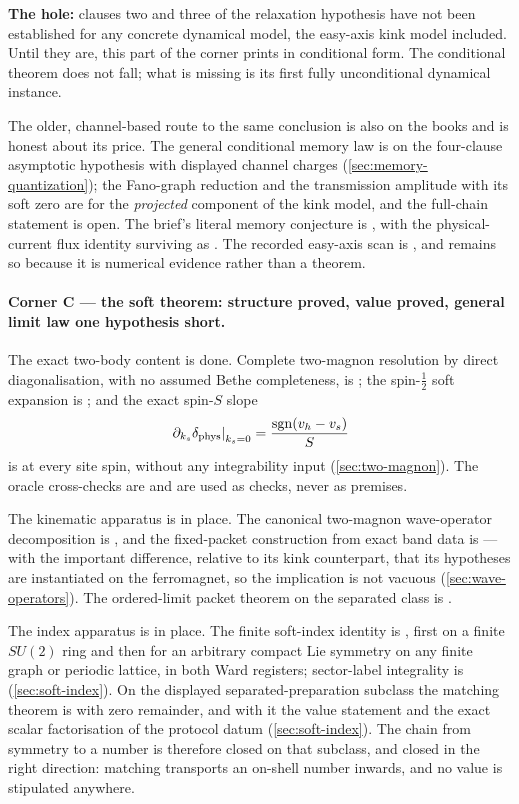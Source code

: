 \textbf{The hole:} clauses two and three of the relaxation hypothesis have not
been established for any concrete dynamical model, the easy-axis kink model
included. Until they are, this part of the corner prints in conditional form.
The conditional theorem does not fall; what is missing is its first fully
unconditional dynamical instance.

The older, channel-based route to the same conclusion is also on the books and
is honest about its price. The general conditional memory law is
\statusProvedConditional{} on the four-clause asymptotic hypothesis with
displayed channel charges (\cref{sec:memory-quantization}); the Fano-graph
reduction and the transmission amplitude with its soft zero are
\statusProved{} for the \emph{projected} component of the kink model, and the
full-chain statement is open. The brief's literal memory conjecture is
\statusRefuted{}, with the physical-current flux identity surviving as
\statusProved{}. The recorded easy-axis scan is \statusSketch{}, and remains
so because it is numerical evidence rather than a theorem.

\paragraph{Corner C --- the soft theorem: structure proved, value proved,
general limit law one hypothesis short.}
The exact two-body content is done. Complete two-magnon resolution by direct
diagonalisation, with no assumed Bethe completeness, is \statusProved{}; the
spin-$\tfrac12$ soft expansion is \statusProved{}; and the exact spin-$S$
slope
\[
  \left.\partial_{k_s}\delta_{\mathrm{phys}}\right|_{k_s=0}
  =\frac{\operatorname{sgn}(v_h-v_s)}{S}
\]
is \statusProved{} at every site spin, without any integrability input
(\cref{sec:two-magnon}). The oracle cross-checks are \statusProved{} and are
used as checks, never as premises.

The kinematic apparatus is in place. The canonical two-magnon wave-operator
decomposition is \statusProved{}, and the fixed-packet construction from exact
band data is \statusProvedConditional{} --- with the important difference,
relative to its kink counterpart, that its hypotheses are instantiated on the
ferromagnet, so the implication is not vacuous
(\cref{sec:wave-operators}). The ordered-limit packet theorem on the separated
class is \statusProved{}.

The index apparatus is in place. The finite soft-index identity is
\statusProved{}, first on a finite $SU(2)$ ring and then for an arbitrary
compact Lie symmetry on any finite graph or periodic lattice, in both Ward
registers; sector-label integrality is \statusProved{}
(\cref{sec:soft-index}). On the displayed separated-preparation subclass the
matching theorem is \statusProved{} with zero remainder, and with it the value
statement and the exact scalar factorisation of the protocol datum
(\cref{sec:soft-index}). The chain from symmetry to a number is therefore
closed on that subclass, and closed in the right direction: matching
transports an on-shell number inwards, and no value is stipulated anywhere.

